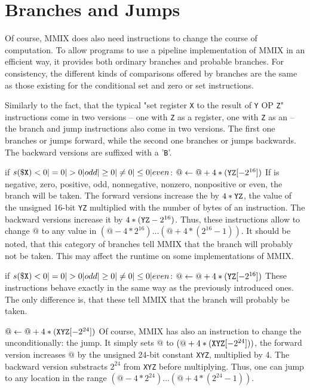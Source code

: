 \section{Branches and Jumps}

Of course, MMIX does also need instructions to change the course of computation. To allow programs to use a pipeline implementation of MMIX in an efficient way, it provides both ordinary branches and probable branches. For consistency, the different kinds of comparisons offered by branches are the same as those existing for the conditional set and zero or set instructions.

Similarly to the fact, that the typical "set register {\tt X} to the result of {\tt Y} OP {\tt Z}" instructions come in two versions -- one with {\tt Z} as a register, one with {\tt Z} as an  -- the branch and jump instructions also come in two versions. The first one branches or jumps forward, while the second one branches or jumps backwards. The backward versions are suffixed with a '{\tt B}'.

\instrtbl
	{}
	{if $s(\dr{X}) <0|=0|>0|odd|\ge0|\ne0|\le0|even$: $@ \leftarrow @+4*({\tt YZ}[-2^{16}])$}
\noindent If  is negative, zero, positive, odd, nonnegative, nonzero, nonpositive or even, the branch will be taken. The forward versions increase the  by $4*{\tt YZ}$, \ie the value of the unsigned 16-bit  {\tt YZ} multiplied with the number of bytes of an instruction. The backward versions increase it by $4*({\tt YZ}-2^{16})$. Thus, these instructions allow to change $@$ to any value in $(@ - 4*2^{16}) \dots (@ + 4*(2^{16}-1))$. It should be noted, that this category of branches tell MMIX that the branch will probably not be taken. This may affect the runtime on some implementations of MMIX. \citep[pg. 12]{mmix-doc}

\instrtbl
	{}
	{if $s(\dr{X}) <0|=0|>0|odd|\ge0|\ne0|\le0|even$: $@ \leftarrow @+4*({\tt YZ}[-2^{16}])$}
\noindent These instructions behave exactly in the same way as the previously introduced ones. The only difference is, that these tell MMIX that the branch will probably be taken. \citep[pg. 12]{mmix-doc}

\instrtbl
	{}
	{$@ \leftarrow @+4*({\tt XYZ}[-2^{24}])$}
\noindent Of course, MMIX has also an instruction to change the  unconditionally: the jump. It simply sets $@$ to $(@+4*({\tt XYZ}[-2^{24}]))$, \ie the forward version increases $@$ by the unsigned 24-bit constant {\tt XYZ}, multiplied by 4. The backward version substracts $2^{24}$ from {\tt XYZ} before multiplying. Thus, one can jump to any location in the range $(@ - 4*2^{24}) \dots (@ + 4*(2^{24}-1))$. \citep[pg. 13]{mmix-doc}

